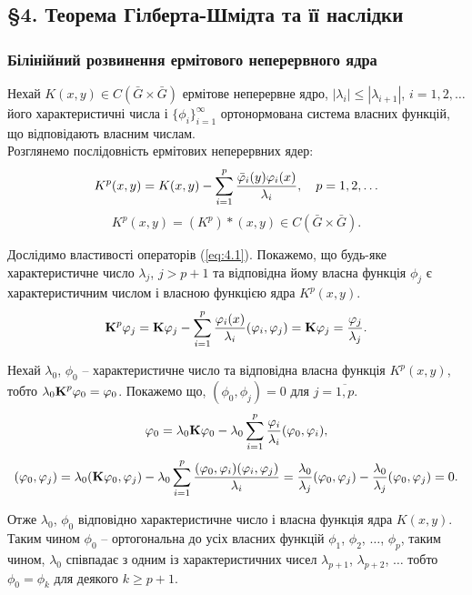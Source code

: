 \subsection*{\S4. Теорема Гілберта-Шмідта та її наслідки}

\subsubsection*{Білінійний розвинення ермітового неперервного ядра}

Нехай $K(x, y) \in C(\bar G \times \bar G)$ ермітове неперервне ядро, $|\lambda_i| \le |\lambda_{i + 1}|$, $i = 1, 2, \ldots$ його характеристичні числа і $\{\phi_i\}_{i = 1}^\infty$ ортонормована система власних функцій, що відповідають власним числам. \\

Розглянемо послідовність ермітових неперервних ядер:
\begin{equation}
	\label{eq:4.1}
	K^p(x, y) = K(x, y) - \Sum_{i = 1}^p \dfrac{\bar \phi_i(y) \phi_i(x)}{\lambda_i}, \quad p = 1, 2, \ldots
\end{equation}
\[ K^p(x, y) = (K^p)*(x, y) \in  C(\bar G \times \bar G). \]

Дослідимо властивості операторів (\ref{eq:4.1}). Покажемо, що будь-яке характеристичне число $\lambda_j$, $j > p + 1$ та відповідна йому власна функція $\phi_j$ є характеристичним числом і власною функцією ядра $K^p(x,y)$.
\begin{equation}
	\label{eq:4.2}
	\bf{K}^p \phi_j = \bf{K} \phi_j - \Sum_{i = 1}^p \dfrac{\phi_i(x)}{\lambda_i} (\phi_i, \phi_j) = \bf{K} \phi_j = \dfrac{\phi_j}{\lambda_j}.
\end{equation}

Нехай $\lambda_0$, $\phi_0$ -- характеристичне число та відповідна власна функція $K^p(x, y)$, тобто $\lambda_0 \bf{K}^p \phi_0 = \phi_0$. Покажемо що, $(\phi_0, \phi_j) = 0$ для $j = \overline{1, p}$.
\[ \phi_0 = \lambda_0 \bf{K} \phi_0 - \lambda_0 \Sum_{i = 1}^p \dfrac{\phi_i}{\lambda_i} (\phi_0, \phi_i), \]
\[ (\phi_0, \phi_j) = \lambda_0 (\bf{K} \phi_0, \phi_j) - \lambda_0 \Sum_{i = 1}^p \dfrac{(\phi_0, \phi_i)(\phi_i, \phi_j)}{\lambda_i} = \dfrac{\lambda_0}{\lambda_j} (\phi_0, \phi_j) - \dfrac{\lambda_0}{\lambda_j} (\phi_0, \phi_j) = 0. \]

Отже $\lambda_0$, $\phi_0$ відповідно характеристичне число і власна функція ядра $K(x, y)$. \\

Таким чином $\phi_0$ -- ортогональна до усіх власних функцій $\phi_1$, $\phi_2$, $\ldots$, $\phi_p$, таким чином, $\lambda_0$ співпадає з одним із характеристичних чисел $\lambda_{p + 1}$, $\lambda_{p + 2}$, $\ldots$ тобто $\phi_0 = \phi_k$ для деякого $k \ge p + 1$. \\

